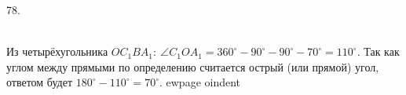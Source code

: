 78. \begin{figure}[ht!]
\end{figure}\\
Из четырёхугольника $OC_1BA_1:\ \angle C_1OA_1=360^\circ-90^\circ-90^\circ-70^\circ=110^\circ.$ Так как углом между прямыми по определению считается острый (или прямой) угол, ответом будет $180^\circ-110^\circ=70^\circ.$
ewpage
oindent
